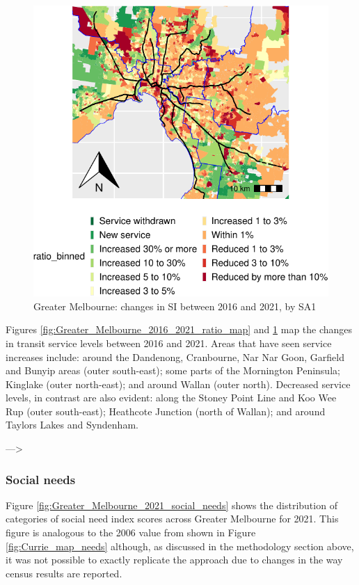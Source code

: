 \documentclass[preprint, 3p,
authoryear]{elsarticle} %
\begin{document}
\begin{figure}
\includegraphics[width=0.9\linewidth]{Leveraging_GTFS_to_assess_transit_supply_Transport_Geography_files/figure-latex/Greater_Melbourne_2016_2021_ratio_map_suburban_railway_extents-1} \caption{Greater Melbourne: changes in SI between 2016 and 2021, by SA1}\label{fig:Greater_Melbourne_2016_2021_ratio_map_suburban_railway_extents}
\end{figure}

Figures \ref{fig:Greater_Melbourne_2016_2021_ratio_map} and
\ref{fig:Greater_Melbourne_2016_2021_ratio_map_suburban_railway_extents}
map the changes in transit service levels between 2016 and 2021. Areas
that have seen service increases include: around the Dandenong,
Cranbourne, Nar Nar Goon, Garfield and Bunyip areas (outer south-east);
some parts of the Mornington Peninsula; Kinglake (outer north-east); and
around Wallan (outer north). Decreased service levels, in contrast are
also evident: along the Stoney Point Line and Koo Wee Rup (outer
south-east); Heathcote Junction (north of Wallan); and around Taylors
Lakes and Syndenham.

---\textgreater{}

\hypertarget{social-needs}{%
\subsubsection{Social needs}\label{social-needs}}

Figure \ref{fig:Greater_Melbourne_2021_social_needs} shows the
distribution of categories of social need index scores across Greater
Melbourne for 2021. This figure is analogous to the 2006 value from
\citet{currie2010identifying} shown in Figure \ref{fig:Currie_map_needs}
although, as discussed in the methodology section above, it was not
possible to exactly replicate the \citet{currie2010identifying} approach
due to changes in the way census results are reported.
\end{document}
